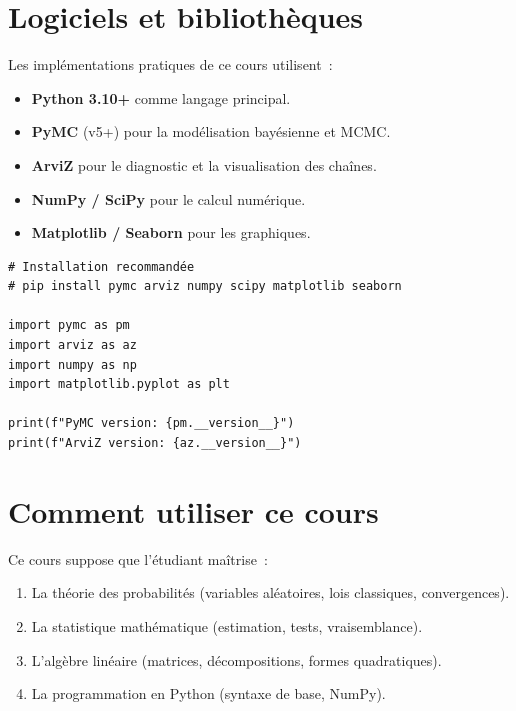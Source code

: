 \section*{Logiciels et biblioth\`eques}

Les impl\'ementations pratiques de ce cours utilisent~:

\begin{itemize}
  \item \textbf{Python 3.10+} comme langage principal.
  \item \textbf{PyMC} (v5+) pour la mod\'elisation bay\'esienne et MCMC.
  \item \textbf{ArviZ} pour le diagnostic et la visualisation des cha\^ines.
  \item \textbf{NumPy / SciPy} pour le calcul num\'erique.
  \item \textbf{Matplotlib / Seaborn} pour les graphiques.
\end{itemize}

\begin{codeblock}[title=\textbf{Installation des d\'ependances}]
\begin{verbatim}
# Installation recommandée
# pip install pymc arviz numpy scipy matplotlib seaborn

import pymc as pm
import arviz as az
import numpy as np
import matplotlib.pyplot as plt

print(f"PyMC version: {pm.__version__}")
print(f"ArviZ version: {az.__version__}")
\end{verbatim}
\end{codeblock}

\section*{Comment utiliser ce cours}

\begin{attention}[title=\textbf{Pr\'erequis importants}]
Ce cours suppose que l'\'etudiant ma\^itrise~:
\begin{enumerate}
  \item La th\'eorie des probabilit\'es (variables al\'eatoires, lois
        classiques, convergences).
  \item La statistique math\'ematique (estimation, tests, vraisemblance).
  \item L'alg\`ebre lin\'eaire (matrices, d\'ecompositions, formes
        quadratiques).
  \item La programmation en Python (syntaxe de base, NumPy).
\end{enumerate}
\end{attention}

